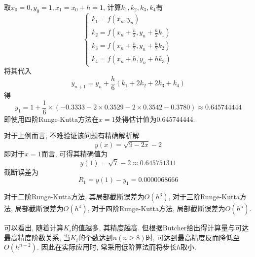 \begin{solution}
    取$x_0=0,y_0=1,x_1=x_0+h=1$, 计算$k_1,k_2,k_3,k_4$有
    \begin{equation*}
        \begin{cases}
            k_1=f(x_n,y_n)\\
            k_2=f(x_n+\frac{h}{2},y_n+\frac{h}{2}k_1)\\
            k_3=f(x_n+\frac{h}{2},y_n+\frac{h}{2}k_2)\\
            k_4=f(x_n+h,y_n+hk_3)
        \end{cases}
    \end{equation*}
    将其代入
    \begin{equation*}
        y_{n+1}=y_n+\frac{h}{6}(k_1+2k_2+2k_3+k_4)
    \end{equation*}
    得
    \begin{equation*}
        y_1=1+\frac{1}{6}\times(-0.3333-2\times0.3529-2\times0.3542-0.3780)\approx0.645744444
    \end{equation*}
    即使用四阶Runge-Kutta方法在$x=1$处得估计值为0.645744444.
\end{solution}

对于上例而言, 不难验证该问题有精确解析解
\begin{equation*}
    y(x)=\sqrt{9-2x}-2
\end{equation*}
即对于$x=1$而言, 可得其精确值为
\begin{equation*}
    y(1)=\sqrt{7}-2\approx0.645751311
\end{equation*}
截断误差为
\begin{equation*}
    R_1=y(1)-y_1=0.0000068666
\end{equation*}

\begin{notice}
    对于二阶Runge-Kutta方法, 其局部截断误差为$O(h^3)$, 对于三阶Runge-Kutta方法, 局部截断误差为$O(h^4)$, 对于四阶Runge-Kutta方法, 局部截断误差为$O(h^5)$.

    可以看出, 随着计算$K_i$的值越多, 其精度越高. 但根据Butcher给出得计算量与可达最高精度阶数关系, 当$K_i$的个数达到$n(n\ge8)$时, 可达到最高精度反而降低至$O(h^{n-2})$. 因此在实际应用时, 常采用低阶算法而将步长$h$取小.
\end{notice}
